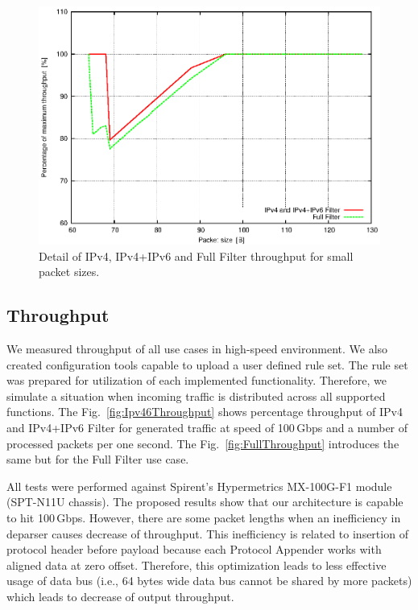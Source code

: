 \begin{figure}
    \centering
    \includegraphics[scale=1.05]{chapters/pic/graphs/h2rc-cases/detail_throughput_ineff}
    \caption{Detail of IPv4, IPv4+IPv6 and Full Filter throughput for small packet sizes.}
    \label{fig:detailThroughputShortPacketLengts}
\end{figure}

\subsection{Throughput}
%

We measured throughput of all use cases in high-speed environment. We also created configuration tools capable to upload a user defined rule set.
The rule set was prepared for utilization of each implemented functionality. Therefore, we simulate a situation when 
incoming traffic is distributed across all supported functions. The Fig.~\ref{fig:Ipv46Throughput} shows percentage throughput
of IPv4 and IPv4+IPv6 Filter for generated traffic at speed of 100\,Gbps and a number of processed packets per one second. 
The Fig.~\ref{fig:FullThroughput} introduces the same but for the Full Filter use case.

All tests were performed against Spirent's Hypermetrics MX-100G-F1 module (SPT-N11U chassis).
The proposed results show that our architecture is capable to hit 100\,Gbps. However, there are some 
packet lengths when an inefficiency in deparser causes decrease of throughput. This inefficiency is related to insertion
of protocol header before payload because each Protocol Appender works with aligned data at zero offset. 
Therefore, this optimization leads to less effective usage of data bus (i.e., 64 bytes wide data bus cannot be shared by more packets) 
which leads to decrease of output throughput. 


